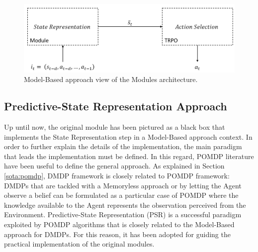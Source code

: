             \begin{figure}[!t]
                    \centering
                    \includegraphics[width=15cm, keepaspectratio]{images/module/modelbased_view.png}
                    \caption{Model-Based approach view of the Modules architecture.}
                    \label{fig:module_modelbased_view}
            \end{figure}
            
        \subsection{Predictive-State Representation Approach}
            Up until now, the original module has been pictured as a black box that implements the State Representation step in a Model-Based approach context. In order to further explain the details of the implementation, the main paradigm that leads the implementation must be defined. In this regard, POMDP literature have been useful to define the general approach. As explained in Section \ref{sota:pomdp}, DMDP framework is closely related to POMDP framework: DMDPs that are tackled with a Memoryless approach or by letting the Agent observe a belief can be formulated as a particular case of POMDP where the knowledge available to the Agent represents the observation perceived from the Environment. Predictive-State Representation (PSR) is a successful paradigm exploited by POMDP algorithms that is closely related to the Model-Based approach for DMDPs. For this reason, it has been adopted for guiding the practical implementation of the original modules.
            
